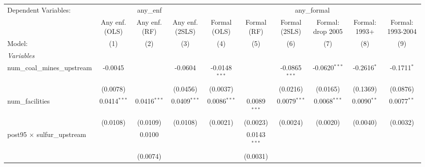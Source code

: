 \makeatletter
{}%
\makeatother

\begingroup
\centering
\begin{tabular}{lccccccccc}
   \tabularnewline \midrule \midrule
   Dependent Variables: & \multicolumn{3}{c}{any\_enf} & \multicolumn{6}{c}{any\_formal}\\
                                                     & Any enf. (OLS) & Any enf. (RF)  & Any enf. (2SLS) & Formal (OLS)    & Formal (RF)    & Formal (2SLS)   & Formal: drop 2005 & Formal: 1993+ & Formal: 1993-2004 \\   
   Model:                                            & (1)            & (2)            & (3)             & (4)             & (5)            & (6)             & (7)               & (8)           & (9)\\  
   \midrule
   \emph{Variables}\\
   num\_coal\_mines\_upstream                        & -0.0045        &                & -0.0604         & -0.0148$^{***}$ &                & -0.0865$^{***}$ & -0.0620$^{***}$   & -0.2616$^{*}$ & -0.1711$^{*}$\\   
                                                     & (0.0078)       &                & (0.0456)        & (0.0037)        &                & (0.0216)        & (0.0165)          & (0.1369)      & (0.0876)\\   
   num\_facilities                                   & 0.0414$^{***}$ & 0.0416$^{***}$ & 0.0409$^{***}$  & 0.0086$^{***}$  & 0.0089$^{***}$ & 0.0079$^{***}$  & 0.0068$^{***}$    & 0.0090$^{**}$ & 0.0077$^{**}$\\   
                                                     & (0.0108)       & (0.0109)       & (0.0108)        & (0.0021)        & (0.0023)       & (0.0024)        & (0.0020)          & (0.0040)      & (0.0032)\\   
   post95 $\times$ sulfur\_upstream                  &                & 0.0100         &                 &                 & 0.0143$^{***}$ &                 &                   &               &   \\   
                                                     &                & (0.0074)       &                 &                 & (0.0031)       &                 &                   &               &   \\   

\end{tabular}
